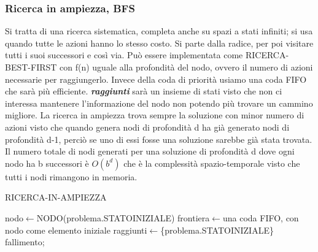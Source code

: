 \documentclass{article}
\begin{document}
\subsubsection{Ricerca in ampiezza, BFS}
Si tratta di una ricerca sistematica, completa anche su spazi a stati infiniti; si usa quando tutte le azioni hanno lo stesso costo. Si parte dalla radice, per poi visitare tutti i suoi successori e così via.
Può essere implementata come RICERCA-BEST-FIRST con f(n) uguale alla profondità del nodo, ovvero il numero di azioni necessarie per raggiungerlo. Invece della coda di priorità usiamo una coda FIFO che sarà più efficiente. \textbf{\textit{raggiunti}} sarà un insieme di stati visto che non ci interessa mantenere l'informazione del nodo non potendo più trovare un cammino migliore. La ricerca in ampiezza trova sempre la soluzione con minor numero di azioni visto che quando genera nodi di profondità d ha già generato nodi di profondità d-1, perciò se uno di essi fosse una soluzione sarebbe già stata trovata. Il numero totale di nodi generati per una soluzione di profondità d dove ogni nodo ha b successori è $O(b^d )$  che è la complessità spazio-temporale visto che tutti i nodi rimangono in memoria.
\begin{center}
\begin{algorithm}
\caption{RICERCA-IN-AMPIEZZA}
nodo$\leftarrow$NODO(problema.STATOINIZIALE)\;
frontiera$\leftarrow$una coda FIFO, con nodo come elemento iniziale\;
raggiunti$\leftarrow$\{problema.STATOINIZIALE\}\;
\Return fallimento;
\end{algorithm}
\end{center}
\newpage
\end{document}
